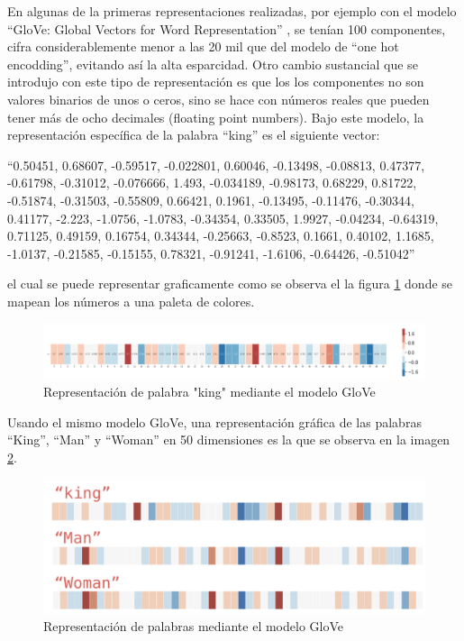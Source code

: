 \documentclass[
  12pt,
  openany]{book}
\begin{document}
En algunas de la primeras representaciones realizadas, por ejemplo con el modelo ``GloVe: Global Vectors for Word Representation'' \citep{pennington2014}, se tenían 100 componentes, cifra considerablemente menor a las 20 mil que del modelo de ``one hot encodding'', evitando así la alta esparcidad. Otro cambio sustancial que se introdujo con este tipo de representación es que los los componentes no son valores binarios de unos o ceros, sino se hace con números reales que pueden tener más de ocho decimales (floating point numbers). Bajo este modelo, la representación específica de la palabra ``king'' es el siguiente vector:

``0.50451, 0.68607, -0.59517, -0.022801, 0.60046, -0.13498, -0.08813, 0.47377, -0.61798, -0.31012, -0.076666, 1.493, -0.034189, -0.98173, 0.68229, 0.81722, -0.51874, -0.31503, -0.55809, 0.66421, 0.1961, -0.13495, -0.11476, -0.30344, 0.41177, -2.223, -1.0756, -1.0783, -0.34354, 0.33505, 1.9927, -0.04234, -0.64319, 0.71125, 0.49159, 0.16754, 0.34344, -0.25663, -0.8523, 0.1661, 0.40102, 1.1685, -1.0137, -0.21585, -0.15155, 0.78321, -0.91241, -1.6106, -0.64426, -0.51042''

el cual se puede representar graficamente como se observa el la figura \ref{fig:embking} donde se mapean los números a una paleta de colores.

\begin{figure}

{\centering \includegraphics[width=0.95\linewidth]{images/03-marco-teorico/embking} 

}

\caption{Representación de palabra "king" mediante el modelo GloVe}\label{fig:embking}
\end{figure}

Usando el mismo modelo GloVe, una representación gráfica de las palabras ``King'', ``Man'' y ``Woman'' en 50 dimensiones es la que se observa en la imagen \ref{fig:GloVeEmbedd}.

\begin{figure}

{\centering \includegraphics[width=0.95\linewidth]{images/03-marco-teorico/embedding} 

}

\caption{Representación de palabras mediante el modelo GloVe}\label{fig:GloVeEmbedd}
\end{figure}
\end{document}
